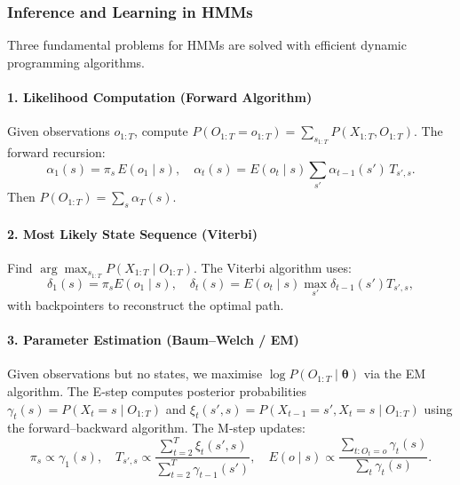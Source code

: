 \documentclass{tufte-handout}
\begin{document}
\begin{marginfigure}
\centering
{}
\caption{Graphical model of an HMM: hidden states $X_t$ (circle) emit observations $O_t$ (square).}
\end{marginfigure}

\subsubsection{Inference and Learning in HMMs}

Three fundamental problems for HMMs are solved with efficient dynamic programming algorithms.

\paragraph{1. Likelihood Computation (Forward Algorithm)}
Given observations $o_{1:T}$, compute $P(O_{1:T}=o_{1:T}) = \sum_{s_{1:T}} P(X_{1:T}, O_{1:T})$. The forward recursion:
\[
\alpha_1(s) = \pi_s \, E(o_1 \mid s), \quad
\alpha_t(s) = E(o_t \mid s) \sum_{s'} \alpha_{t-1}(s') \, T_{s', s}.
\]
Then $P(O_{1:T}) = \sum_s \alpha_T(s)$.

\paragraph{2. Most Likely State Sequence (Viterbi)}
Find $\arg\max_{s_{1:T}} P(X_{1:T} \mid O_{1:T})$. The Viterbi algorithm uses:
\[
\delta_1(s) = \pi_s E(o_1 \mid s),\quad
\delta_t(s) = E(o_t \mid s) \max_{s'} \delta_{t-1}(s') T_{s', s},
\]
with backpointers to reconstruct the optimal path.

\paragraph{3. Parameter Estimation (Baum–Welch / EM)}
Given observations but no states, we maximise $\log P(O_{1:T} \mid \boldsymbol{\theta})$ via the EM algorithm. The E‑step computes posterior probabilities $\gamma_t(s) = P(X_t=s \mid O_{1:T})$ and $\xi_t(s',s) = P(X_{t-1}=s', X_t=s \mid O_{1:T})$ using the forward–backward algorithm. The M‑step updates:
\[
\pi_s \propto \gamma_1(s),\quad T_{s',s} \propto \frac{\sum_{t=2}^T \xi_t(s',s)}{\sum_{t=2}^T \gamma_{t-1}(s')},\quad
E(o \mid s) \propto \frac{\sum_{t: O_t=o} \gamma_t(s)}{\sum_t \gamma_t(s)}.
\]
\end{document}
